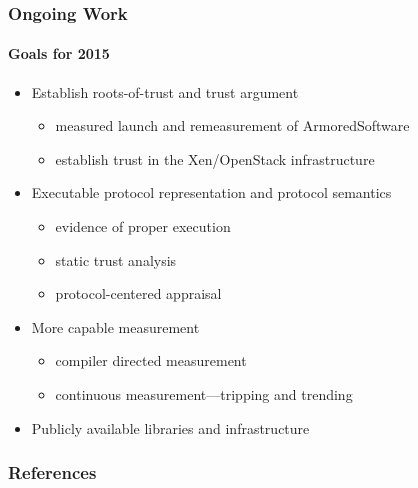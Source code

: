 \documentclass{beamer}
\begin{document}
\begin{frame}
  \frametitle{Ongoing Work}
  \framesubtitle{Goals for 2015}

  \begin{itemize}
  \item Establish roots-of-trust and trust argument
    \begin{itemize}
    \item measured launch and remeasurement of ArmoredSoftware
    \item establish trust in the Xen/OpenStack infrastructure
    \end{itemize}
  \item Executable protocol representation and protocol semantics
    \begin{itemize}
    \item evidence of proper execution
    \item static trust analysis
    \item protocol-centered appraisal
    \end{itemize}
  \item More capable measurement
    \begin{itemize}
    \item compiler directed measurement
    \item continuous measurement---tripping and trending
    \end{itemize}
  \item Publicly available libraries and infrastructure
  \end{itemize}
\end{frame}

\nocite{Coker::Principles-of-R,Haldar:04:Semantic-Remote,Fabrega:1999aa,Ryan:09:Introduction-to,Loscocco:98:The-Inevitabili}

\begin{frame}
  \frametitle{References}
  \begin{small}
  
  \end{small}
\end{frame}
\end{document}
